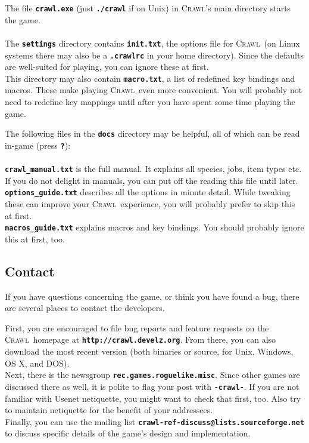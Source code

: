 \documentclass[a4paper,10pt]{article}
\newcommand{\key}[1]{{{\texttt{\textbf{#1}}}}} %
\newcommand{\slsl}{/\hspace{-0.2em}/} %
\newcommand{\crawl}{\textsc{Crawl}}
\newcommand{\spacecolumn}{\begin{minipage}[t]{2cm}\phantom{xxxx}\end{minipage}}
\begin{document}
\begin{minipage}[t]{7cm}
The file \key{crawl.exe} (just \key{./crawl} if on Unix) in \crawl's main 
directory starts the game.
\\ \\
The \key{settings} directory contains \key{init.txt}, the options file for
\crawl\ (on Linux systems there may also be a \key{.crawlrc} in your home
directory). Since the defaults are well-suited for playing, you can ignore
these at first.
\\
This directory may also contain \key{macro.txt}, a list of redefined key 
bindings and macros. These make playing \crawl\ even more convenient. 
You will probably not need to redefine key mappings until after you have
spent some time playing the game.
\end{minipage}
%
\spacecolumn
%
\begin{minipage}[t]{7cm}
The following files in the \key{docs} directory may be helpful, all of
which can be read in-game (press \key{?}):
\\ \\
\key{crawl\_manual.txt} is the full manual. It explains all species, jobs, 
item types etc. If you do not delight in manuals, you can put off the 
reading this file until later.
\\
\key{options\_guide.txt} describes all the options in minute detail. While
tweaking these can improve your \crawl\ experience, you will probably prefer
to skip this at first.
\\
\key{macros\_guide.txt} explains macros and key bindings. You should probably
ignore this at first, too.
\end{minipage}

\subsection*{Contact}
	    
If you have questions concerning the game, or think you have found a bug, 
there are several places to contact the developers. 

First, you are encouraged to file bug reports and feature requests on the 
\crawl\ homepage at \key{http:\slsl crawl.develz.org}. From there, you 
can also download the most recent version (both binaries or source, for 
Unix, Windows, OS X, and DOS).
\\
Next, there is the newsgroup \key{rec.games.roguelike.misc}. Since other 
games are discussed there as well, it is polite to flag your post with 
\key{-crawl-}. If you are not familiar with Usenet netiquette, you might 
want to check that first, too. Also try to maintain netiquette for the 
benefit of your addressees.
\\
Finally, you can use the mailing list 
\key{crawl-ref-discuss@lists.sourceforge.net}
to discuss specific details of the game's design and implementation.
\end{document}
